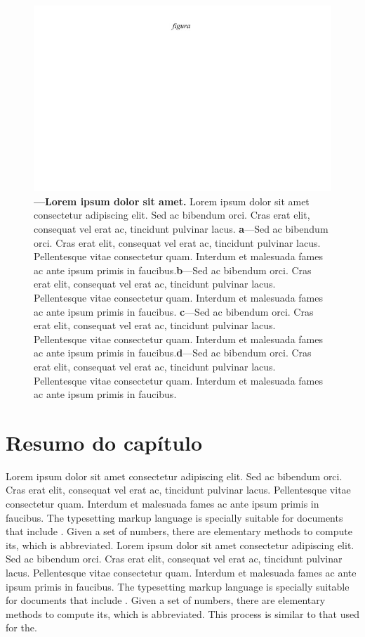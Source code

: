 \documentclass[./main.tex]{subfiles}
\begin{document}
\begin{figure}[t!] 
\centering				
\includegraphics[width=0.95\linewidth]{figs/fig_m.jpg}		
\caption[Lorem ipsum dolor sit amet]
{\textbf{---\;Lorem ipsum dolor sit amet.}
    Lorem ipsum dolor sit amet consectetur adipiscing elit. Sed ac bibendum orci. Cras erat elit, consequat vel erat ac, tincidunt pulvinar lacus. \;\textbf{a}\;---\;Sed ac bibendum orci. Cras erat elit, consequat vel erat ac, tincidunt pulvinar lacus. Pellentesque vitae consectetur quam. Interdum et malesuada fames ac ante ipsum primis in faucibus.\;\textbf{b}\;---\;Sed ac bibendum orci. Cras erat elit, consequat vel erat ac, tincidunt pulvinar lacus. Pellentesque vitae consectetur quam. Interdum et malesuada fames ac ante ipsum primis in faucibus. \;\textbf{c}\;---\;Sed ac bibendum orci. Cras erat elit, consequat vel erat ac, tincidunt pulvinar lacus. Pellentesque vitae consectetur quam. Interdum et malesuada fames ac ante ipsum primis in faucibus.\;\textbf{d}\;---\;Sed ac bibendum orci. Cras erat elit, consequat vel erat ac, tincidunt pulvinar lacus. Pellentesque vitae consectetur quam. Interdum et malesuada fames ac ante ipsum primis in faucibus.
}
\label{fig:hydro:2} 		
\end{figure}

\clearpage

\section{Resumo do capítulo} \label{sec:hydro:summary}

\par Lorem ipsum dolor sit amet consectetur adipiscing elit. Sed ac bibendum orci. Cras erat elit, consequat vel erat ac, tincidunt pulvinar lacus. Pellentesque vitae consectetur quam. Interdum et malesuada fames ac ante ipsum primis in faucibus. The typesetting markup language is specially suitable for documents that include . Given a set of numbers, there are elementary methods to compute its, which is abbreviated. Lorem ipsum dolor sit amet consectetur adipiscing elit. Sed ac bibendum orci. Cras erat elit, consequat vel erat ac, tincidunt pulvinar lacus. Pellentesque vitae consectetur quam. Interdum et malesuada fames ac ante ipsum primis in faucibus. The typesetting markup language is specially suitable for documents that include . Given a set of numbers, there are elementary methods to compute its, which is abbreviated. This process is similar to that used for the.
\end{document}
